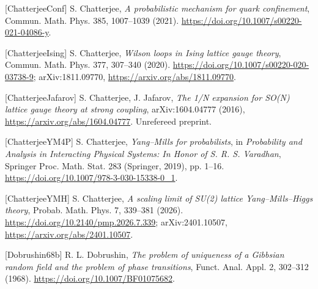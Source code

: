 \documentclass[10pt,letterpaper,twocolumn]{article}
\begin{document}
{[}ChatterjeeConf{]} S. Chatterjee, \emph{A probabilistic mechanism for quark confinement}, Commun. Math. Phys. 385, 1007--1039 (2021). \href{https://doi.org/10.1007/s00220-021-04086-y}{https:\allowbreak{}/\allowbreak{}/\allowbreak{}doi.\allowbreak{}org/\allowbreak{}10.\allowbreak{}1007/\allowbreak{}s00220-\allowbreak{}021-\allowbreak{}04086-\allowbreak{}y}.

{[}ChatterjeeIsing{]} S. Chatterjee, \emph{Wilson loops in Ising lattice gauge theory}, Commun. Math. Phys. 377, 307--340 (2020). \href{https://doi.org/10.1007/s00220-020-03738-9}{https:\allowbreak{}/\allowbreak{}/\allowbreak{}doi.\allowbreak{}org/\allowbreak{}10.\allowbreak{}1007/\allowbreak{}s00220-\allowbreak{}020-\allowbreak{}03738-\allowbreak{}9}; arXiv:1811.09770, \href{https://arxiv.org/abs/1811.09770}{https:\allowbreak{}/\allowbreak{}/\allowbreak{}arxiv.\allowbreak{}org/\allowbreak{}abs/\allowbreak{}1811.\allowbreak{}09770}.

{[}ChatterjeeJafarov{]} S. Chatterjee, J. Jafarov, \emph{The 1/N expansion for SO(N) lattice gauge theory at strong coupling}, arXiv:1604.04777 (2016), \href{https://arxiv.org/abs/1604.04777}{https:\allowbreak{}/\allowbreak{}/\allowbreak{}arxiv.\allowbreak{}org/\allowbreak{}abs/\allowbreak{}1604.\allowbreak{}04777}. Unrefereed preprint.

{[}ChatterjeeYM4P{]} S. Chatterjee, \emph{Yang--Mills for probabilists}, in \emph{Probability and Analysis in Interacting Physical Systems: In Honor of S. R. S. Varadhan}, Springer Proc. Math. Stat. 283 (Springer, 2019), pp. 1--16. \href{https://doi.org/10.1007/978-3-030-15338-0_1}{https:\allowbreak{}/\allowbreak{}/\allowbreak{}doi.\allowbreak{}org/\allowbreak{}10.\allowbreak{}1007/\allowbreak{}978-\allowbreak{}3-\allowbreak{}030-\allowbreak{}15338-\allowbreak{}0\_\allowbreak{}1}.

{[}ChatterjeeYMH{]} S. Chatterjee, \emph{A scaling limit of SU(2) lattice Yang--Mills--Higgs theory}, Probab. Math. Phys. 7, 339--381 (2026). \href{https://doi.org/10.2140/pmp.2026.7.339}{https:\allowbreak{}/\allowbreak{}/\allowbreak{}doi.\allowbreak{}org/\allowbreak{}10.\allowbreak{}2140/\allowbreak{}pmp.\allowbreak{}2026.\allowbreak{}7.\allowbreak{}339}; arXiv:2401.10507, \href{https://arxiv.org/abs/2401.10507}{https:\allowbreak{}/\allowbreak{}/\allowbreak{}arxiv.\allowbreak{}org/\allowbreak{}abs/\allowbreak{}2401.\allowbreak{}10507}.

{[}Dobrushin68b{]} R. L. Dobrushin, \emph{The problem of uniqueness of a Gibbsian random field and the problem of phase transitions}, Funct. Anal. Appl. 2, 302--312 (1968). \href{https://doi.org/10.1007/BF01075682}{https:\allowbreak{}/\allowbreak{}/\allowbreak{}doi.\allowbreak{}org/\allowbreak{}10.\allowbreak{}1007/\allowbreak{}BF010756\allowbreak{}82}.
\end{document}
